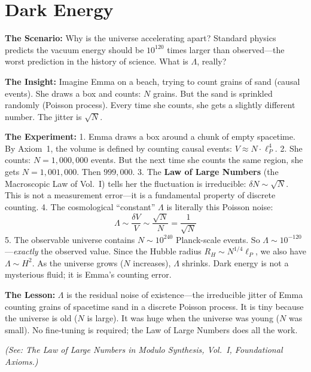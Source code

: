 \documentclass[11pt, a4paper, openany]{book}
\newcommand{\lP}{\ell_P}
\begin{document}
\section{Dark Energy}
\begin{thoughtexp}
\textbf{The Scenario:} Why is the universe accelerating apart? Standard physics predicts the vacuum energy should be $10^{120}$ times larger than observed---the worst prediction in the history of science. What is $\Lambda$, really?

\textbf{The Insight:} Imagine Emma on a beach, trying to count grains of sand (causal events). She draws a box and counts: $N$ grains. But the sand is sprinkled randomly (Poisson process). Every time she counts, she gets a slightly different number. The jitter is $\sqrt{N}$.

\textbf{The Experiment:}
1. Emma draws a box around a chunk of empty spacetime. By Axiom~1, the volume is defined by counting causal events: $V \approx N \cdot \ell_P^4$.
2. She counts: $N = 1{,}000{,}000$ events. But the next time she counts the same region, she gets $N = 1{,}001{,}000$. Then $999{,}000$.
3. The \textbf{Law of Large Numbers} (the Macroscopic Law of Vol.~I) tells her the fluctuation is irreducible: $\delta N \sim \sqrt{N}$. This is not a measurement error---it is a fundamental property of discrete counting.
4. The cosmological ``constant'' $\Lambda$ is literally this Poisson noise:
\[
  \Lambda \sim \frac{\delta V}{V} \sim \frac{\sqrt{N}}{N} = \frac{1}{\sqrt{N}}
\]
5. The observable universe contains $N \sim 10^{240}$ Planck-scale events. So $\Lambda \sim 10^{-120}$---\emph{exactly} the observed value. Since the Hubble radius $R_H \sim N^{1/4} \lP$, we also have $\Lambda \sim H^2$. As the universe grows ($N$ increases), $\Lambda$ shrinks. Dark energy is not a mysterious fluid; it is Emma's counting error.

\textbf{The Lesson:} $\Lambda$ is the residual noise of existence---the irreducible jitter of Emma counting grains of spacetime sand in a discrete Poisson process. It is tiny because the universe is old ($N$ is large). It was huge when the universe was young ($N$ was small). No fine-tuning is required; the Law of Large Numbers does all the work.

\textit{(See: The Law of Large Numbers in Modulo Synthesis, Vol.~I, Foundational Axioms.)}
\end{thoughtexp}
\end{document}
